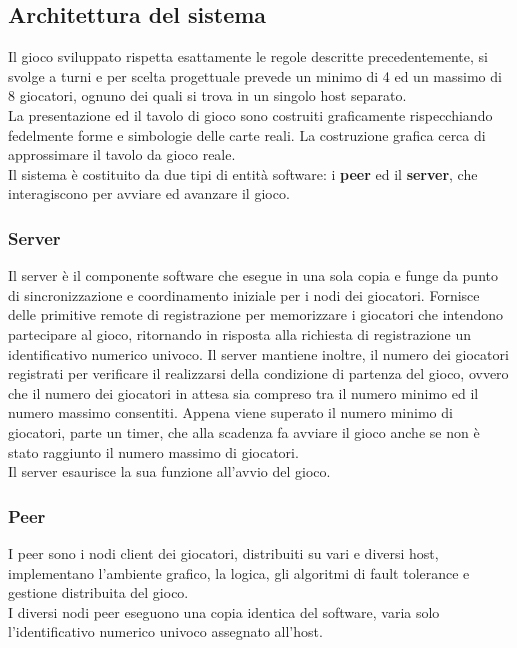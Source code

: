\documentclass[10pt,a4paper]{article}
\begin{document}
\subsection{Architettura del sistema}
Il gioco sviluppato rispetta esattamente le regole descritte precedentemente, si svolge a turni e per scelta progettuale prevede un minimo di 4 ed un massimo di 8 giocatori, ognuno dei quali si trova in un singolo host separato. \\La presentazione ed il tavolo di gioco sono costruiti graficamente rispecchiando fedelmente forme e simbologie delle carte reali. La costruzione grafica cerca di approssimare il tavolo da gioco reale. \\Il sistema è costituito da due tipi di entità software: i \textbf{peer} ed il \textbf{server}, che interagiscono per avviare ed avanzare il gioco.
\subsubsection{Server}
Il server è il componente software che esegue in una sola copia e funge da punto di sincronizzazione e coordinamento iniziale per i nodi dei giocatori. Fornisce delle primitive remote di registrazione per memorizzare i giocatori che intendono partecipare al gioco, ritornando in risposta alla richiesta di registrazione un identificativo numerico univoco. Il server mantiene inoltre, il numero dei giocatori registrati per verificare il realizzarsi della condizione di partenza del gioco, ovvero che il numero dei giocatori in attesa sia compreso tra il numero minimo ed il numero massimo consentiti. Appena viene superato il numero minimo di giocatori, parte un timer, che alla scadenza fa avviare il gioco anche se non è stato raggiunto il numero massimo di giocatori. \\ Il server esaurisce la sua funzione all'avvio del gioco.

\subsubsection{Peer}
I peer sono i nodi client dei giocatori, distribuiti su vari e diversi host, implementano l'ambiente grafico, la logica, gli algoritmi di fault tolerance e gestione distribuita del gioco.\\ I diversi nodi peer eseguono una copia identica del software, varia solo l'identificativo numerico univoco assegnato all'host.
\end{document}
